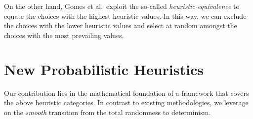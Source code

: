 \documentclass{ws-ijait}
\newtheorem{property}{Property}
\begin{document}
On the other hand, Gomes et al.\ exploit the so-called
\emph{heuristic-equivalence} to equate the choices with the
highest heuristic values. In this way, we can exclude the
choices with the lower heuristic values and select at random
amongst the choices with the most prevailing
values.\cite{equivalence}


\section{New Probabilistic Heuristics}

Our contribution lies in the mathematical foundation of a
framework that covers the above heuristic categories. In
contrast to existing methodologies, we leverage on the
\emph{smooth} transition from the total randomness to
determinism.

%
\end{document}
